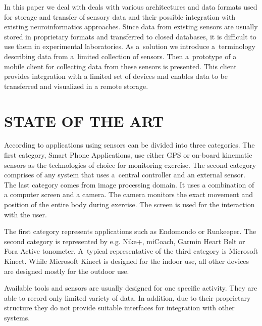 \documentclass[a4paper,twoside]{article}
\begin{document}
In this paper we deal with deals with various architectures and data formats used for storage and transfer of sensory data and their possible integration with existing neuroinformatics approaches. Since data from existing sensors are usually stored in proprietary formats and transferred to closed databases, it is difficult to use them in experimental laboratories. As a~solution we introduce a~terminology describing data from a~limited collection of sensors. Then a~prototype of a mobile client for collecting data from these sensors is presented. This client provides integration with a limited set of devices and enables data to be transferred and visualized in a remote storage.

\section{\uppercase{state of the art}}
\label{sec:state-of-the-art}

\noindent
According to \cite{Lowe2012242} applications using sensors can be divided into three categories. The first category, Smart Phone Applications, use either GPS or 
on-board kinematic sensors as the technologies of choice for monitoring exercise. The second category comprises of any system that uses a~central controller
and an external sensor. The last category comes from image processing domain. It uses a combination of a computer screen and a camera. The camera monitors the exact movement and position of the entire body during exercise. The screen is used for the interaction with the user.

The first category represents applications such as Endomondo or Runkeeper. The second category is represented by e.g. Nike+, miCoach, Garmin Heart Belt or Fora Active tonometer. A~typical representative of the third category is Microsoft Kinect. While Microsoft Kinect is designed for the indoor use, all other devices are designed mostly for the outdoor use.

Available tools and sensors are usually designed for one specific activity. They are able to record only limited variety of data. In addition, due to their proprietary structure they do not provide suitable interfaces for integration with other systems.
\end{document}
